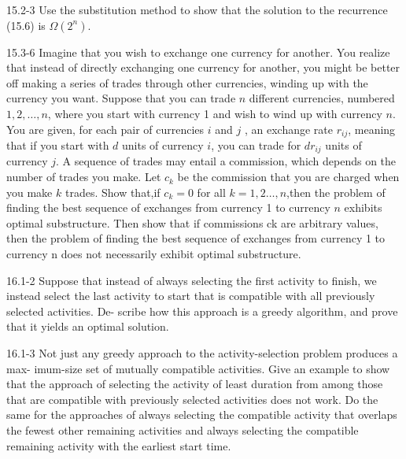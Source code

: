 





\homeworkheader{\classnameandsection}

\begin{problem}{15.2-3}
  Use the substitution method to show that the solution to the recurrence (15.6) is $\Omega(2^n)$.
\end{problem}

\begin{problem}{15.3-6}
  Imagine that you wish to exchange one currency for another. You realize that instead of directly exchanging one
  currency for another, you might be better off making a series of trades through other currencies, winding up with the
  currency you want. Suppose that you can trade $n$ different currencies, numbered $1, 2, \ldots, n$, where you start
  with currency 1 and wish to wind up with currency $n$. You are given, for each pair of currencies $i$ and $j$ , an
  exchange rate $r_{ij}$, meaning that if you start with $d$ units of currency $i$, you can trade for $dr_{ij}$ units of
  currency $j$. A sequence of trades may entail a commission, which depends on the number of trades you make. Let $c_k$
  be the commission that you are charged when you make $k$ trades. Show that,if $c_k = 0$ for all $k = 1,2
  \dots,n$,then the problem of finding the best sequence of exchanges from currency 1 to currency $n$ exhibits optimal
  substructure. Then show that if commissions ck are arbitrary values, then the problem of finding the best sequence of
  exchanges from currency 1 to currency n does not necessarily exhibit optimal substructure.
\end{problem}

\begin{problem}{16.1-2}
  Suppose that instead of always selecting the first activity to finish, we instead select the last activity to start
  that is compatible with all previously selected activities. De- scribe how this approach is a greedy algorithm, and
  prove that it yields an optimal solution.
\end{problem}

\begin{problem}{16.1-3}
  Not just any greedy approach to the activity-selection problem produces a max- imum-size set of mutually compatible
  activities. Give an example to show that the approach of selecting the activity of least duration from among those
  that are compatible with previously selected activities does not work. Do the same for the approaches of always
  selecting the compatible activity that overlaps the fewest other remaining activities and always selecting the
  compatible remaining activity with the earliest start time.
\end{problem}


